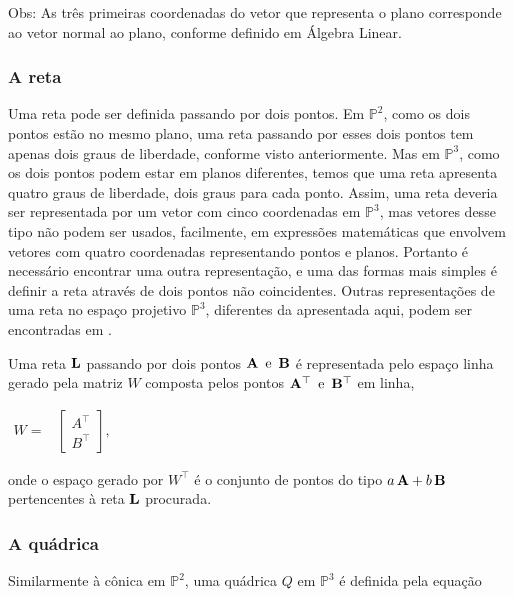 Obs: As três primeiras coordenadas do vetor que representa o plano corresponde ao vetor normal ao plano, conforme definido em Álgebra Linear.
\\


\subsubsection*{A reta}

Uma reta pode ser definida passando por dois pontos. Em $\mathbb{P}^2$, como os dois pontos estão no mesmo plano, uma reta passando por esses dois pontos tem apenas dois graus de liberdade, conforme visto anteriormente. Mas em $\mathbb{P}^3$, como os dois pontos podem estar em planos diferentes, temos que uma reta apresenta quatro graus de liberdade, dois graus para cada ponto. Assim, uma reta deveria ser representada por um vetor com cinco coordenadas em $\mathbb{P}^3$, mas vetores desse tipo não podem ser usados, facilmente, em expressões matemáticas que envolvem vetores com quatro coordenadas representando pontos e planos. Portanto é necessário encontrar uma outra representação, e uma das formas mais simples é definir a reta através de dois pontos não coincidentes. Outras representações de uma reta no espaço projetivo $\mathbb{P}^3$, diferentes da apresentada aqui, podem ser encontradas em \cite{Hartley2004}.


Uma reta ${\bf L}$ passando por dois pontos ${\bf A} \,\,\, \text{e} \,\,\, {\bf B}$ é representada pelo espaço linha gerado pela matriz $W$ composta pelos pontos ${\bf A}^\top \,\,\,\text{e} \,\,\, {\bf B}^\top$ em linha,

\begin{center}
$
\begin{array}{cc}
W = 
& \begin{bmatrix}
  A^\top\\
  B^\top
  \end{bmatrix},
\end{array}
$
\end{center}
onde o espaço gerado por $W^\top$ é o conjunto de pontos do tipo $a\,{\bf A} + b\,{\bf B}$ pertencentes à reta ${\bf L}$ procurada. \\


\subsubsection*{A quádrica}


Similarmente à cônica em $\mathbb{P}^2$, uma quádrica $Q$ em $\mathbb{P}^3$ é definida pela equação


